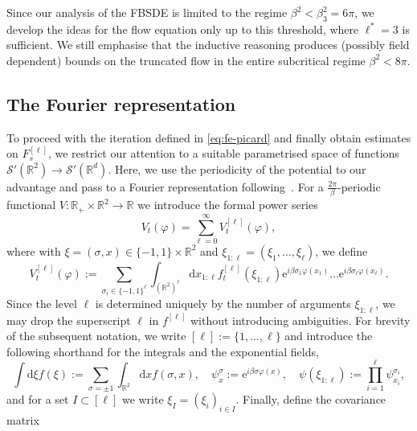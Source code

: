 \documentclass[11pt, a4paper]{scrartcl}
\numberwithin{equation}{section}
\theoremstyle{plain}
\theoremstyle{remark}
\newcommand{\assign}{:=}
\newcommand{\mathd}{\mathrm{d}}
\newcommand{\mathe}{\mathrm{e}}
\begin{document}
Since our analysis of the FBSDE is limited to the regime $\beta^2 < \beta_3^2
	= 6 \pi$, we develop the ideas for the flow equation only up to this
threshold, where $\ell^{\ast} = 3$ is sufficient. We still emphasise that the
inductive reasoning produces (possibly field dependent) bounds on the
truncated flow in the entire subcritical regime $\beta^2 < 8 \pi$.

\subsection{The Fourier representation}

To proceed with the iteration defined in \eqref{eq:fe-picard} and finally
obtain estimates on $F_s^{[\ell]}$, we restrict our attention to a suitable
parametrised space of functions $\mathcal{S}' (\mathbb{R}^2) \rightarrow
	\mathcal{S}' (\mathbb{R}^d)$. Here, we use the periodicity of the potential to
our advantage and pass to a Fourier representation
following~{\cite{brydgesMayerExpansionsHamiltonJacobi1987}}. For a $\frac{2
		\pi}{\beta}$-periodic functional $V : \mathbb{R}_+ \times \mathbb{R}^2
	\rightarrow \mathbb{R}$ we introduce the formal power series
\begin{equation}
	V_t (\varphi) = \sum_{\ell = 0}^{\infty} V_t^{[\ell]} (\varphi),
	\label{eq:formal-fourier}
\end{equation}
where with $\xi = (\sigma, x) \in \{ - 1, 1 \} \times \mathbb{R}^2$ and
$\xi_{1 : \ell} = (\xi_1, \ldots, \xi_{\ell})$, we define
\begin{equation}
	V_t^{[\ell]} (\varphi) \assign \sum_{\sigma_i \in \{ - 1, 1 \}^{\ell}}
	\int_{(\mathbb{R}^2)^{\ell}} \mathd x_{1 : \ell} f_t^{[\ell]} (\xi_{1 :
		\ell}) \mathe^{i \beta \sigma_1 \varphi (x_1)} \ldots \mathe^{i \beta
		\sigma_{\ell} \varphi (x_{\ell})} . \label{eq:fourier-rep-V}
\end{equation}
Since the level $\ell$ is determined uniquely by the number of arguments
$\xi_{1 : \ell}$, we may drop the superscript $\ell$ in $f^{[\ell]}$ without
introducing ambiguities. For brevity of the subsequent notation, we write
$[\ell]:=\{1,\dots,\ell\}$ and introduce
the following shorthand for the integrals and the exponential fields,
\[
	\int \mathd \xi f (\xi) \assign \sum_{\sigma = \pm 1} \int_{\mathbb{R}^2}
	\mathd xf (\sigma, x),  \quad \psi_x^{\sigma} \assign \mathe^{i \beta
		\sigma \varphi (x)}, \quad  \psi (\xi_{1 : \ell}) \assign \prod_{i =
		1}^{\ell} \psi_{x_i}^{\sigma_i},
\]
and for a set $I\subset [\ell]$ we write $\xi_I=(\xi_i)_{i\in I}$.
Finally, define the covariance matrix
\end{document}
